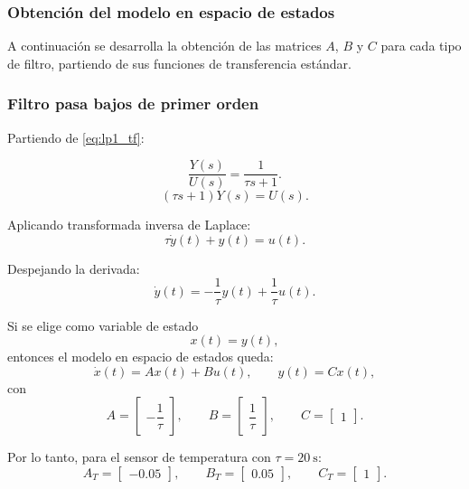 \documentclass[12pt, a4paper,journal, onecolumn, compsoc]{IEEEtran}
\begin{document}
\subsubsection*{Obtención del modelo en espacio de estados}

A continuación se desarrolla la obtención de las matrices $A$, $B$ y $C$ para cada tipo de filtro, partiendo de sus funciones de transferencia estándar.

\subsubsection*{Filtro pasa bajos de primer orden}

Partiendo de \eqref{eq:lp1_tf}:

\begin{equation}
    \frac{Y(s)}{U(s)}=\frac{1}{\tau s+1}.
\end{equation}
\begin{equation}
    (\tau s+1)Y(s)=U(s).
\end{equation}

Aplicando transformada inversa de Laplace:
\begin{equation}
    \tau \dot{y}(t)+y(t)=u(t).
\end{equation}

Despejando la derivada:
\begin{equation}
    \dot{y}(t)=-\frac{1}{\tau}y(t)+\frac{1}{\tau}u(t).
\end{equation}

Si se elige como variable de estado
\begin{equation}
    x(t)=y(t),
\end{equation}
entonces el modelo en espacio de estados queda:
\begin{equation}
    \dot{x}(t)=Ax(t)+Bu(t), \qquad y(t)=Cx(t),
\end{equation}
con
\begin{equation}
    A=\begin{bmatrix}
        -\dfrac{1}{\tau}
    \end{bmatrix},
    \qquad
    B=\begin{bmatrix}
        \dfrac{1}{\tau}
    \end{bmatrix},
    \qquad
    C=\begin{bmatrix}
        1
    \end{bmatrix}.
\end{equation}

Por lo tanto, para el sensor de temperatura con $\tau=20\ \text{s}$:
\begin{equation}
    A_T=\begin{bmatrix}
        -0.05
    \end{bmatrix},
    \qquad
    B_T=\begin{bmatrix}
        0.05
    \end{bmatrix},
    \qquad
    C_T=\begin{bmatrix}
        1
    \end{bmatrix}.
\end{equation}
\end{document}
